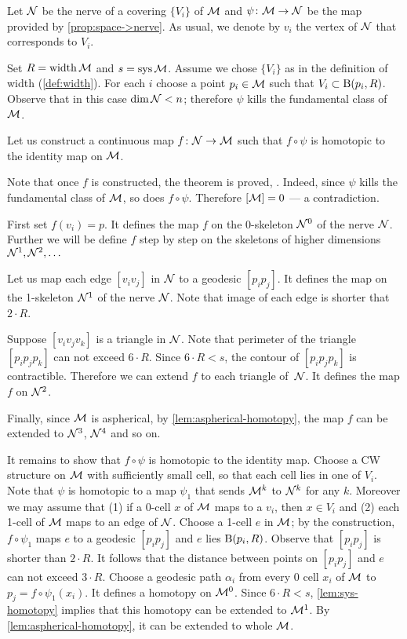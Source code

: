 Let $\mathcal{N}$ be the nerve of a covering $\{V_i\}$ of $\mathcal{M}$ and $\psi\colon\mathcal{M}\to\mathcal{N}$ be the map provided by \ref{prop:space->nerve}.
As usual, we denote by $v_i$ the vertex of $\mathcal{N}$ that corresponds to $V_i$.

Set $R=\operatorname{\rm width}\nolimits \mathcal{M}$ and $s=\mathop{\rm sys}\nolimits\mathcal{M}$.
Assume we chose $\{V_i\}$ as in the definition of width (\ref{def:width}).
For each $i$ choose a point $p_i\in \mathcal{M}$ such that $V_i\subset \mathrm{B}{}(p_i,R)$.
Observe that in this case $\operatorname{\rm dim}\nolimits\mathcal{N}<n$;
therefore $\psi$ kills the fundamental class of $\mathcal{M}$.

Let us construct a continuous map  $f\colon\mathcal{N}\to  \mathcal{M}$ such that
$f\circ\psi$ is homotopic to the identity map on $\mathcal{M}$.

Note that once $f$ is constructed, the theorem is proved, .
Indeed, since $\psi$ kills the fundamental class of $\mathcal{M}$, so does $f\circ\psi$.
Therefore $[\mathcal{M}]=0$ --- a contradiction.

First set $f(v_i)=p$.
It defines the map $f$ on the 0-skeleton $\mathcal{N}^0$ of the nerve $\mathcal{N}$.
Further we will be define $f$ step by step on the skeletons of higher dimensions $\mathcal{N}^1,\mathcal{N}^2, \dots$

Let us map each edge $[v_iv_j]$ in $\mathcal{N}$ to a geodesic $[p_ip_j]$.
It defines the map on the 1-skeleton $\mathcal{N}^1$ of the nerve $\mathcal{N}$.
Note that image of each edge is shorter that $2\cdot R$.

Suppose $[v_iv_jv_k]$ is a triangle in $\mathcal{N}$.
Note that perimeter of the triangle $[p_ip_jp_k]$ can not exceed $6\cdot R$.
Since $6\cdot R<s$, the contour of $[p_ip_jp_k]$ is contractible.
Therefore we can extend $f$ to each triangle of~$\mathcal{N}$.
It defines the map $f$ on $\mathcal{N}^2$.

Finally, since $\mathcal{M}$ is aspherical, by \ref{lem:aspherical-homotopy}, the map $f$ can be extended to $\mathcal{N}^3$, $\mathcal{N}^4$ and so on.

It remains to show that $f\circ\psi$ is homotopic to the identity map.
Choose a CW structure on $\mathcal{M}$ with sufficiently small cell, so that each cell lies in one of $V_i$.
Note that $\psi$ is homotopic to a map $\psi_1$ that sends $\mathcal{M}^k$ to $\mathcal{N}^k$ for any $k$.
Moreover we may assume that (1) if a 0-cell $x$ of $\mathcal{M}$ maps to a $v_i$, then $x\in V_i$ and (2) each 1-cell  of $\mathcal{M}$ maps to an edge of $\mathcal{N}$.
Choose a 1-cell $e$ in $\mathcal{M}$; by the construction, $f\circ\psi_1$ maps $e$ to a geodesic $[p_ip_j]$ and $e$ lies $\mathrm{B}{}(p_i,R)$.
Observe that $[p_ip_j]$ is shorter than $2\cdot R$.
It follows that the distance between points on $[p_ip_j]$ and $e$ can not exceed $3\cdot R$.
Choose a geodesic path $\alpha_i$ from every 0 cell $x_i$  of $\mathcal{M}$ to $p_j=f\circ\psi_1(x_i)$.
It defines a homotopy on $\mathcal{M}^0$.
Since $6\cdot R<s$, \ref{lem:sys-homotopy} implies that this homotopy can be extended to $\mathcal{M}^1$.
By \ref{lem:aspherical-homotopy}, it can be extended to whole $\mathcal{M}$.
\qeds

